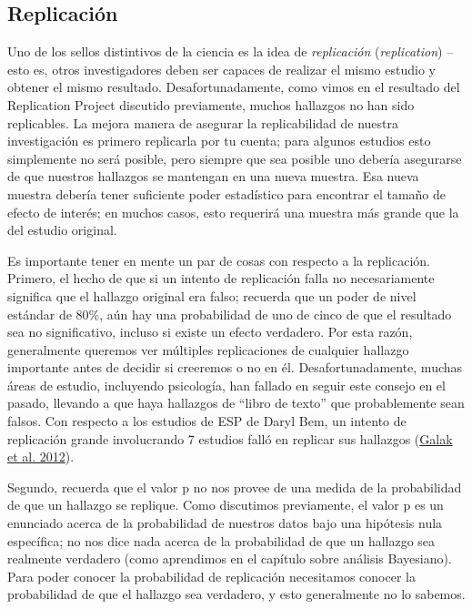 \documentclass[
  12pt,
]{book}
\theoremstyle{definition}
\theoremstyle{definition}
\theoremstyle{definition}
\theoremstyle{remark}
\begin{document}
\hypertarget{replicaciuxf3n}{%
\subsection{Replicación}\label{replicaciuxf3n}}

Uno de los sellos distintivos de la ciencia es la idea de \emph{replicación} (\emph{replication}) -- esto es, otros investigadores deben ser capaces de realizar el mismo estudio y obtener el mismo resultado. Desafortunadamente, como vimos en el resultado del Replication Project discutido previamente, muchos hallazgos no han sido replicables. La mejora manera de asegurar la replicabilidad de nuestra investigación es primero replicarla por tu cuenta; para algunos estudios esto simplemente no será posible, pero siempre que sea posible uno debería asegurarse de que nuestros hallazgos se mantengan en una nueva muestra. Esa nueva muestra debería tener suficiente poder estadístico para encontrar el tamaño de efecto de interés; en muchos casos, esto requerirá una muestra más grande que la del estudio original.

Es importante tener en mente un par de cosas con respecto a la replicación. Primero, el hecho de que si un intento de replicación falla no necesariamente significa que el hallazgo original era falso; recuerda que un poder de nivel estándar de 80\%, aún hay una probabilidad de uno de cinco de que el resultado sea no significativo, incluso si existe un efecto verdadero. Por esta razón, generalmente queremos ver múltiples replicaciones de cualquier hallazgo importante antes de decidir si creeremos o no en él. Desafortunadamente, muchas áreas de estudio, incluyendo psicología, han fallado en seguir este consejo en el pasado, llevando a que haya hallazgos de ``libro de texto'' que probablemente sean falsos. Con respecto a los estudios de ESP de Daryl Bem, un intento de replicación grande involucrando 7 estudios falló en replicar sus hallazgos (\protect\hyperlink{ref-gala:lebo:nels:2012}{Galak et al. 2012}).

Segundo, recuerda que el valor p no nos provee de una medida de la probabilidad de que un hallazgo se replique. Como discutimos previamente, el valor p es un enunciado acerca de la probabilidad de nuestros datos bajo una hipótesis nula específica; no nos dice nada acerca de la probabilidad de que un hallazgo sea realmente verdadero (como aprendimos en el capítulo sobre análisis Bayesiano). Para poder conocer la probabilidad de replicación necesitamos conocer la probabilidad de que el hallazgo sea verdadero, y esto generalmente no lo sabemos.
\end{document}
